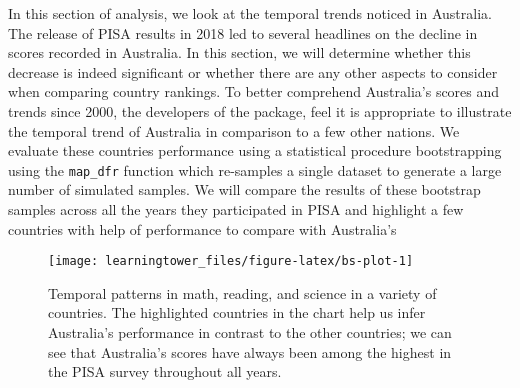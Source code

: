 In this section of analysis, we look at the temporal trends noticed in Australia. The release of PISA results in 2018 led to several headlines on the decline in scores recorded in Australia. In this section, we will determine whether this decrease is indeed significant or whether there are any other aspects to consider when comparing country rankings. To better comprehend Australia's scores and trends since 2000, the developers of the  package, feel it is appropriate to illustrate the temporal trend of Australia in comparison to a few other nations. We evaluate these countries performance using a statistical procedure bootstrapping using the \texttt{map\_dfr} function which re-samples a single dataset to generate a large number of simulated samples. We will compare the results of these bootstrap samples across all the years they participated in PISA and highlight a few countries with help of  \citep{gghighlight} performance to compare with Australia's

\begin{figure}[H]
\texttt{[image: learningtower\_files/figure-latex/bs-plot-1]} \caption{Temporal patterns in math, reading, and science in a variety of countries. The highlighted countries in the chart help us infer Australia's performance in contrast to the other countries; we can see that Australia's scores have always been among the highest in the PISA survey throughout all years.}\label{fig:bs-plot}
\end{figure}

